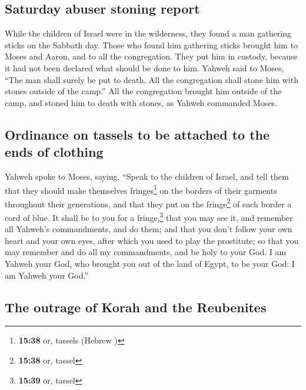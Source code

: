 \hypertarget{saturday-abuser-stoning-report}{%
\subsection{Saturday abuser stoning
report}\label{saturday-abuser-stoning-report}}

 While the children of Israel were in the wilderness,
they found a man gathering sticks on the Sabbath day. 
Those who found him gathering sticks brought him to Moses and Aaron, and
to all the congregation.  They put him in custody,
because it had not been declared what should be done to him.
 Yahweh said to Moses, ``The man shall surely be put to
death. All the congregation shall stone him with stones outside of the
camp.''  All the congregation brought him outside of the
camp, and stoned him to death with stones, as Yahweh commanded Moses.

\hypertarget{ordinance-on-tassels-to-be-attached-to-the-ends-of-clothing}{%
\subsection{Ordinance on tassels to be attached to the ends of
clothing}\label{ordinance-on-tassels-to-be-attached-to-the-ends-of-clothing}}

 Yahweh spoke to Moses, saying,  ``Speak
to the children of Israel, and tell them that they should make
themselves fringes\footnote{\textbf{15:38} or, tassels (Hebrew
  )} on the borders of their garments throughout their
generations, and that they put on the fringe\footnote{\textbf{15:38} or,
  tassel} of each border a cord of blue.  It shall be to
you for a fringe,\footnote{\textbf{15:39} or, tassel} that you may see
it, and remember all Yahweh's commandments, and do them; and that you
don't follow your own heart and your own eyes, after which you used to
play the prostitute;  so that you may remember and do all
my commandments, and be holy to your God.  I am Yahweh
your God, who brought you out of the land of Egypt, to be your God: I am
Yahweh your God.''

\hypertarget{the-outrage-of-korah-and-the-reubenites}{%
\subsection{The outrage of Korah and the
Reubenites}\label{the-outrage-of-korah-and-the-reubenites}}

